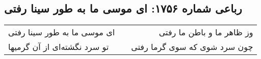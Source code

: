 \begin{center}
\section*{رباعی شماره ۱۷۵۶: ای موسی ما به طور سینا رفتی}
\label{sec:1756}
\begin{longtable}{l p{0.5cm} r}
ای موسی ما به طور سینا رفتی
&&
وز ظاهر ما و باطن ما رفتی
\\
تو سرد نگشته‌ای از آن گرمیها
&&
چون سرد شوی که سوی گرما رفتی
\\
\end{longtable}
\end{center}
